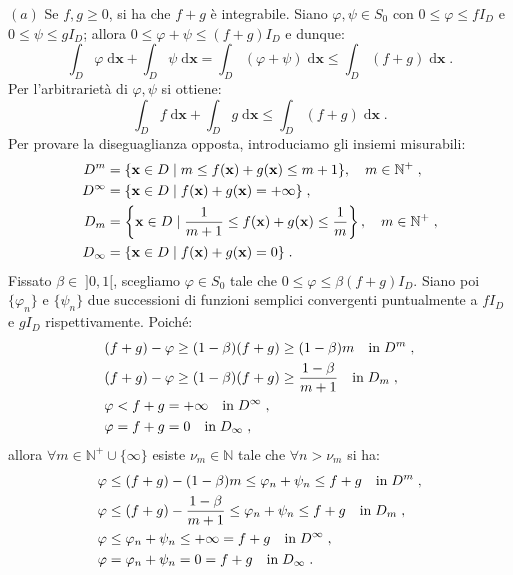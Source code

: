 \documentclass[a4paper,12pt]{report}
\theoremstyle{plain}
\theoremstyle{definition}
\theoremstyle{remark}
\newcommand{\diff}[1]{\mathrm{d}#1}
\numberwithin{equation}{section}
\begin{document}
$(a)$ Se $f,g\ge 0$, si ha che $f+g$ è integrabile. Siano $\varphi,\psi\in S_0$ con $0\le\varphi\le fI_D$ e $0\le\psi\le gI_D$; allora 
$0\le \varphi+\psi\le (f+g)I_D$ e dunque:
\begin{equation}
\int_D \varphi\;\diff{\mathbf{x}}+\int_D \psi\;\diff{\mathbf{x}}=\int_D(\varphi+\psi)\;\diff{\mathbf{x}}\le \int_D(f+g)\;\diff{\mathbf{x}}\;.
\end{equation}
Per l'arbitrarietà di $\varphi,\psi$ si ottiene:
\begin{equation}
\int_D f\;\diff{\mathbf{x}}+\int_D g\;\diff{\mathbf{x}}\le \int_D(f+g)\;\diff{\mathbf{x}}\;.
\end{equation}
Per provare la diseguaglianza opposta, introduciamo gli insiemi misurabili:
\begin{align}
D^m &=\{\mathbf{x}\in D\;|\; m\le f(\mathbf{x})+g(\mathbf{x})\le m+1\},\quad m\in\mathbb{N}^+\;, \notag \\
D^{\infty} &= \{\mathbf{x}\in D\;|\; f(\mathbf{x})+g(\mathbf{x})=+\infty\}\;, \notag \\
D_m &=\left\{\mathbf{x}\in D\;|\; \frac{1}{m+1}\le f(\mathbf{x})+g(\mathbf{x})\le \frac{1}{m}\right\},\quad m\in\mathbb{N}^+\;, \notag \\
D_{\infty} &=\{\mathbf{x}\in D\;|\; f(\mathbf{x})+g(\mathbf{x})=0\}\;.
\end{align}
Fissato $\beta \in\;]0,1[$, scegliamo $\varphi\in S_0$ tale che $0\le \varphi\le \beta(f+g)I_D$. Siano poi $\{\varphi_n\}$ e $\{\psi_n\}$
 due successioni di funzioni semplici convergenti puntualmente a $fI_D$ e $gI_D$ rispettivamente. Poiché:
 \begin{align}
 &(f+g)-\varphi \ge (1-\beta)(f+g)\ge (1-\beta)m\quad\mbox{in}\; D^m\;, \notag \\
 &(f+g)-\varphi \ge (1-\beta)(f+g)\ge \frac{1-\beta}{m+1}\quad\mbox{in}\; D_m\;, \notag \\
&\varphi<f+g=+\infty\quad \mbox{in}\; D^{\infty}\;, \notag \\
&\varphi=f+g=0\quad \mbox{in}\; D_{\infty}\;, 
 \end{align}
allora $\forall m\in \mathbb{N}^+\cup\{\infty\}$ esiste $\nu_m\in \mathbb{N}$ tale che $\forall n>\nu_m$ si ha:
\begin{align}
&\varphi\le (f+g)-(1-\beta)m\le\varphi_n+\psi_n\le f+g\quad\mbox{in}\; D^m\;, \notag \\
&\varphi\le (f+g)-\frac{1-\beta}{m+1}\le \varphi_n+\psi_n\le f+g\quad \mbox{in}\; D_m\;, \notag \\
&\varphi\le \varphi_n+\psi_n\le +\infty=f+g\quad \mbox{in}\; D^{\infty}\;, \notag \\
&\varphi=\varphi_n+\psi_n=0=f+g\quad \mbox{in}\;D_{\infty}\;.
\end{align}
\end{document}

